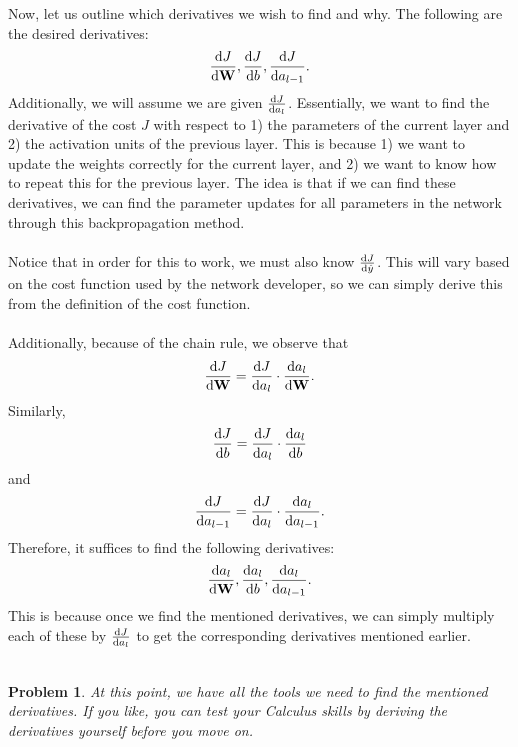 \documentclass{article}
\newtheorem*{problem}{Problem}
\begin{document}
Now, let us outline which derivatives we wish to find and why. The following are the desired derivatives:
\[\diff{J}{\textbf{W}}, \diff{J}{b}, \diff{J}{a_{l-1}}.\]
Additionally, we will assume we are given $\diff{J}{a_l}$. Essentially, we want to find the derivative of the cost $J$ with respect to 1) the parameters of the current layer and 2) the activation units of the previous layer. This is because 1) we want to update the weights correctly for the current layer, and 2) we want to know how to repeat this for the previous layer. The idea is that if we can find these derivatives, we can find the parameter updates for all parameters in the network through this backpropagation method.
\\
\\
Notice that in order for this to work, we must also know $\diff{J}{\hat{y}}$. This will vary based on the cost function used by the network developer, so we can simply derive this from the definition of the cost function.
\\
\\
Additionally, because of the chain rule, we observe that 
\[\diff{J}{\textbf{W}} = \diff{J}{a_l} \cdot \diff{a_l}{\textbf{W}}.\]
Similarly,
\[\diff{J}{b} = \diff{J}{a_l} \cdot \diff{a_l}{b}\]
and 
\[\diff{J}{a_{l-1}} = \diff{J}{a_l} \cdot \diff{a_l}{a_{l-1}}.\]
Therefore, it suffices to find the following derivatives:
\[\diff{a_l}{\textbf{W}}, \diff{a_l}{b}, \diff{a_l}{a_{l-1}}.\]
This is because once we find the mentioned derivatives, we can simply multiply each of these by $\diff{J}{a_l}$ to get the corresponding derivatives mentioned earlier.
\\
\\
\begin{problem}
At this point, we have all the tools we need to find the mentioned derivatives. If you like, you can test your Calculus skills by deriving the derivatives yourself before you move on. 
\end{problem}
\end{document}
